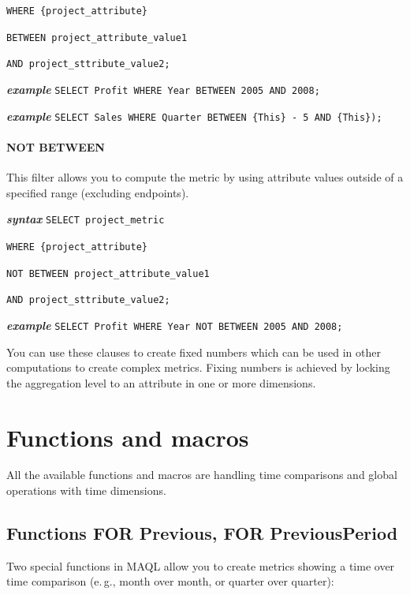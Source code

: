 \documentclass[a4paper, 12pt, titlepage, fleqn]{article}
\begin{document}
\hspace{2.2cm}\verb=WHERE {project_attribute}=

\hspace{2.2cm}\verb=BETWEEN project_attribute_value1 =

\hspace{2.2cm}\verb=AND project_sttribute_value2;=

\textbf{\emph{example}}  \hspace{.9cm}\verb=SELECT Profit WHERE Year BETWEEN 2005 AND 2008;=

\textbf{\emph{example}}  \hspace{.9cm}\verb=SELECT Sales WHERE Quarter BETWEEN {This} - 5 AND {This});=


\paragraph*{NOT BETWEEN} This filter allows you to compute the metric by using attribute values outside of a specified range (excluding endpoints).

\textbf{\emph{syntax}}  \hspace{.9cm}\verb=SELECT project_metric=

\hspace{2.2cm}\verb=WHERE {project_attribute}=

\hspace{2.2cm}\verb=NOT BETWEEN project_attribute_value1 =

\hspace{2.2cm}\verb=AND project_sttribute_value2;=

\textbf{\emph{example}}  \hspace{.9cm}\verb=SELECT Profit WHERE Year NOT BETWEEN 2005 AND 2008;=

You can use these clauses to create fixed numbers which can be used in other computations to create complex metrics. Fixing numbers is achieved by locking the aggregation level to an attribute in one or more dimensions.

\section{Functions and macros}

All the available functions and macros are handling time comparisons and global operations with time dimensions.

\subsection{Functions FOR Previous, FOR PreviousPeriod}
\label{functions}
Two special functions in MAQL allow you to create metrics showing a time over time comparison (e.\,g., month over month, or quarter over quarter): 
\end{document}
